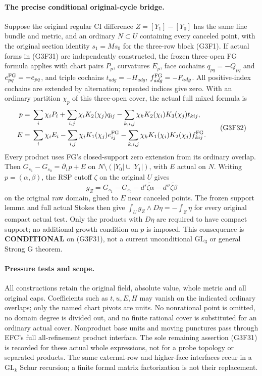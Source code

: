 \paragraph{The precise conditional original-cycle bridge.}
Suppose the original regular CI difference $Z=[Y_1]-[Y_0]$ has
the same line bundle and metric, and an ordinary $N\subset U$
containing every canceled point, with the original section identity
$s_1=Ms_0$ for the three-row block (G3F1).  If actual forms in
(G3F31) are independently constructed, the frozen three-open FG
formula applies with chart pairs $P_p$, curvatures $E_p$,
face cochains $q_{pq}=-Q_{pq}$ and $e^{\rm FG}_{pq}=-e_{pq}$,
and triple cochains $t_{adg}=-H_{adg}$, $f^{\rm FG}_{adg}=-F_{adg}$.
All positive-index cochains are extended by alternation; repeated
indices give zero.  With an ordinary partition $\chi_p$ of this
three-open cover, the actual full mixed formula is
\[
 \begin{split}
 p={}&\sum_i\chi_iP_i+\sum_{i,j}\chi_iK_2(\chi_j)q_{ij}
           -\sum_{k,i,j}\chi_kK_2(\chi_i)K_3(\chi_j)t_{kij},\\
 E={}&\sum_i\chi_iE_i-\sum_{i,j}\chi_iK_1(\chi_j)e^{\rm FG}_{ij}
           -\sum_{k,i,j}\chi_kK_1(\chi_i)K_2(\chi_j)f^{\rm FG}_{kij}.
 \end{split}
 \tag{G3F32}
\]
Every product uses FG's closed-support zero extension from its
ordinary overlap.  Then $G_{s_1}-G_{s_0}=\partial_1p+E$ on
$N\setminus(|Y_0|\cup|Y_1|)$, with $E$ actual on $N$.
Writing $p=(\alpha,\beta)$, the RSP cutoff $\zeta$ on the original
$U$ gives
\[
 g_Z=G_{s_1}-G_{s_0}
       -d'\widetilde{\zeta\alpha}-d''\widetilde{\zeta\beta}
 \tag{G3F33}
\]
on the original raw domain, glued to $E$ near canceled points.
The frozen support lemma and full actual Stokes then give
$\int_Ug_Z\wedge D\eta=-\int_Z\eta$ for every original compact
actual test.  Only the products with $D\eta$ are required to have
compact support; no additional growth condition on $p$ is imposed.
This consequence is \textbf{CONDITIONAL} on (G3F31), not a current
unconditional $\mathrm{GL}_3$ or general Strong G theorem.

\paragraph{Pressure tests and scope.}
All constructions retain the original field, absolute value,
whole metric and all original caps.  Coefficients such as $t,u,E,H$
may vanish on the indicated ordinary overlaps; only the named
chart pivots are units.  No nonrational point is omitted, no domain
degree is divided out, and no finite rational cover is substituted
for an ordinary actual cover.  Nonproduct base units and moving
punctures pass through EFC's full all-refinement product interface.
The sole remaining assertion (G3F31) is recorded for these actual
whole expressions, not for a probe topology or separated products.
The same external-row and higher-face interfaces recur in a
$\mathrm{GL}_k$ Schur recursion; a finite formal matrix
factorization is not their replacement.

